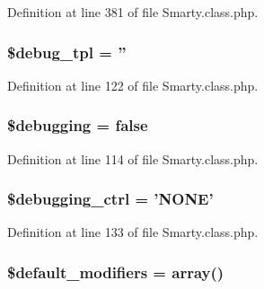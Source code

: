 \-Definition at line 381 of file \-Smarty.\-class.\-php.

\hypertarget{class_smarty_adbe83b13ba657998e0fb861b44ecfd59}{
\subsubsection[{\$debug\-\_\-tpl}]{\setlength{\rightskip}{0pt plus 5cm}\$debug\-\_\-tpl = ''}}\label{class_smarty_adbe83b13ba657998e0fb861b44ecfd59}


\-Definition at line 122 of file \-Smarty.\-class.\-php.

\hypertarget{class_smarty_a22d995c07dbbe5b426d4fda3931cfcca}{
\subsubsection[{\$debugging}]{\setlength{\rightskip}{0pt plus 5cm}\$debugging = false}}\label{class_smarty_a22d995c07dbbe5b426d4fda3931cfcca}


\-Definition at line 114 of file \-Smarty.\-class.\-php.

\hypertarget{class_smarty_a9b02ae21521c28e6eeb53bd58777aa7b}{
\subsubsection[{\$debugging\-\_\-ctrl}]{\setlength{\rightskip}{0pt plus 5cm}\$debugging\-\_\-ctrl = '\-N\-O\-N\-E'}}\label{class_smarty_a9b02ae21521c28e6eeb53bd58777aa7b}


\-Definition at line 133 of file \-Smarty.\-class.\-php.

\hypertarget{class_smarty_a48ec112144d4921e3a31fb1a5526ad2f}{
\subsubsection[{\$default\-\_\-modifiers}]{\setlength{\rightskip}{0pt plus 5cm}\$default\-\_\-modifiers = array()}}\label{class_smarty_a48ec112144d4921e3a31fb1a5526ad2f}


